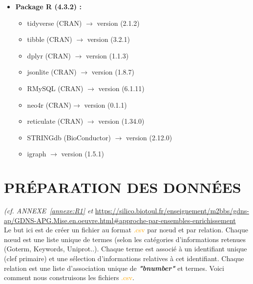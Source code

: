 \documentclass[a4paper,11pt,openright]{report}
\begin{document}
\begin{itemize}
\item \textbf{Package R (4.3.2) : } 
	\begin{itemize}[label=\textbullet]
	\item tidyverse (CRAN)  $\rightarrow$  version (2.1.2)
	\item tibble (CRAN)  $\rightarrow$  version (3.2.1)
	\item dplyr (CRAN)  $\rightarrow$  version (1.1.3)
	\item jsonlite (CRAN) $\rightarrow$  version (1.8.7)
	\item RMySQL (CRAN) $\rightarrow$ version (6.1.11) 
	\item neo4r (CRAN)$\rightarrow$ version (0.1.1)
	\item reticulate (CRAN) $\rightarrow$ version (1.34.0)
	\item STRINGdb (BioConductor) $\rightarrow$ version (2.12.0)
	\item igraph $\rightarrow$ version (1.5.1)
	\end{itemize}

\end{itemize} 

	\section{PRÉPARATION DES DONNÉES} 
\textit{(cf. ANNEXE~\ref{annexe:R1} et }
\url{https://silico.biotoul.fr/enseignement/m2bbs/gdns-ap/GDNS-APG.Mise.en.oeuvre.html\#approche-par-ensembles-enrichissement} \\
Le but ici est de créer un fichier au format \textcolor{orange}{.csv} par nœud et par relation. Chaque nœud est une liste unique de termes (selon les catégories d'informations retenues (Goterm, Keywords, Uniprot..). Chaque terme est associé à un identifiant unique (clef primaire) et une sélection d'informations relatives à cet identifiant. Chaque relation est une liste d'association unique de \textbf{\textit{"bnumber"}} et termes. Voici comment nous construisons les fichiers \textcolor{orange}{.csv}. \\ 
\end{document}
